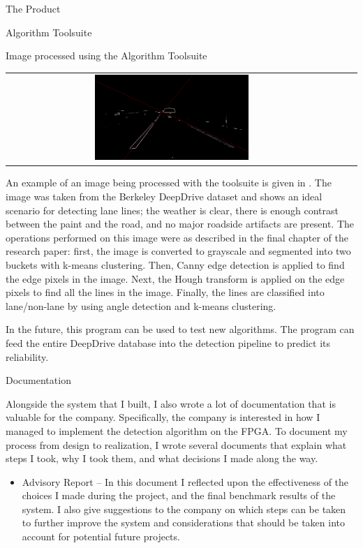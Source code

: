 \documentclass{matthijs}
\begin{document}
\begin{hoofdstuk}{The Product}
\begin{paragraaf}{Algorithm Toolsuite}
\begin{figuur}{Image processed using the Algorithm Toolsuite}
{\begin{tabular}{ccc}
					\includegraphics[width=0.475\textwidth]{0a0a0b1a-7c39d841.kmeans.out.png} \\
				\end{tabular}
				}
			\end{figuur}
			\vspace{0.5ex}
			
			\noindent An example of an image being processed with the toolsuite is given in .
			The image was taken from the Berkeley DeepDrive dataset and shows an ideal scenario for detecting lane lines; the weather is clear, there is enough contrast between the paint and the road, and no major roadside artifacts are present.
			The operations performed on this image were as described in the final chapter of the research paper: first, the image is converted to grayscale and segmented into two buckets with k-means clustering.
			Then, Canny edge detection is applied to find the edge pixels in the image.
			Next, the Hough transform is applied on the edge pixels to find all the lines in the image.
			Finally, the lines are classified into lane/non-lane by using angle detection and k-means clustering.

			In the future, this program can be used to test new algorithms.
			The program can feed the entire DeepDrive database into the detection pipeline to predict its reliability.

		\end{paragraaf}

		\begin{paragraaf}{Documentation}

			Alongside the system that I built, I also wrote a lot of documentation that is valuable for the company.
			Specifically, the company is interested in how I managed to implement the detection algorithm on the FPGA.
			To document my process from design to realization, I wrote several documents that explain what steps I took, why I took them, and what decisions I made along the way.

			\begin{itemize}
				\item Advisory Report --
					In this document I reflected upon the effectiveness of the choices I made during the project, and the final benchmark results of the system. 
					I also give suggestions to the company on which steps can be taken to further improve the system and considerations that should be taken into account for potential future projects.


\end{itemize}
\end{paragraaf}
\end{hoofdstuk}
\end{document}
